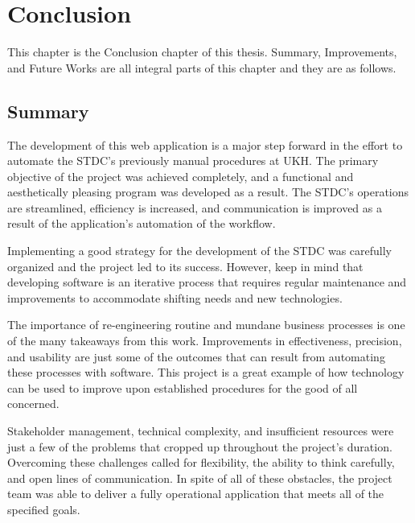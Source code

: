\chapter{Conclusion}

\begin{justify}
    This chapter is the Conclusion chapter of this thesis. Summary, Improvements, and Future Works are all integral parts of this chapter and they are as follows.\\
\end{justify}

\section{Summary}
\begin{justify}
    The development of this web application is a major step forward in the effort to automate the STDC's previously manual procedures at UKH. The primary objective of the project was achieved completely, and a functional and aesthetically pleasing program was developed as a result. The STDC's operations are streamlined, efficiency is increased, and communication is improved as a result of the application's automation of the workflow.

    \vspace{0.25cm}
    \newendline Implementing a good strategy for the development of the STDC was carefully organized and  the project led to its success. However, keep in mind that developing software is an iterative process that requires regular maintenance and improvements to accommodate shifting needs and new technologies.
    
    \vspace{0.25cm}
    \newendline The importance of re-engineering routine and mundane business processes is one of the many takeaways from this work. Improvements in effectiveness, precision, and usability are just some of the outcomes that can result from automating these processes with software. This project is a great example of how technology can be used to improve upon established procedures for the good of all concerned.
    
    \vspace{0.25cm}
    \newendline Stakeholder management, technical complexity, and insufficient resources were just a few of the problems that cropped up throughout the project's duration. Overcoming these challenges called for flexibility, the ability to think carefully, and open lines of communication. In spite of all of these obstacles, the project team was able to deliver a fully operational application that meets all of the specified goals.
    

\end{justify}

